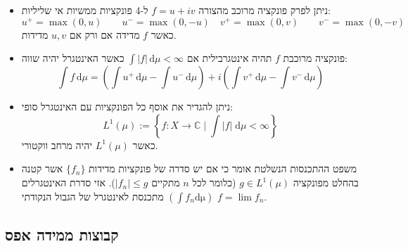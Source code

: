 \documentclass{tstextbook}
\begin{document}
\begin{summary}
  \begin{itemize}
    \item ניתן לפרק פונקציה מרוכב מהצורה \(f = u + iv\) ל-4 פונקציות ממשיות אי שליליות:
$$u^+ = \max(0, u) \qquad u^- = \max(0, -u)\quad v^+ = \max(0, v) \qquad v^- = \max(0, -v)$$
כאשר \(f\) מדידה אם ורק אם \(u, v\) מדידות.
    \item פונקציה מרוכבת \(f\) תהיה אינטגרבילית אם \(\int |f| \, \mathrm{d}\mu < \infty\) כאשר האינטגרל יהיה שווה:
$$\int f \, \mathrm{d}\mu = \left( \int u^+ \, \mathrm{d}\mu - \int u^- \, \mathrm{d}\mu \right) + i \left( \int v^+ \, \mathrm{d}\mu - \int v^- \, \mathrm{d}\mu \right)$$
    \item ניתן להגדיר את אוסף כל הפונקציות עם האינטגרל סופי:
$$L^{1}\left( \mu \right):= \left\{  f:X\to \mathbb{C} \mid \int  \lvert f \rvert  \;\mathrm{d} \mu < \infty   \right\}$$
כאשר \(L^{1}\left( \mu \right)\) יהיה מרחב ווקטורי.
    \item משפט ההתכנסות הנשלטת אומר כי אם יש סדרה של פונקציות מדידות \(\{ f_{n} \}\) אשר קטנה בהחלט מפונקציה \(g \in L^{1}\left( \mu \right)\) (כלומר לכל \(n\) מתקיים \(|f_{n}|\leq g\)). אזי סדרת האינטגרלים \(\left( \int f_{n}\mathrm{d\mu} \right)\) מתכנסת לאינטגרל של הגבול הנקודתי \(f=\lim f_{n}\).
  \end{itemize}
\end{summary}
\subsection{קבוצות ממידה אפס}
\end{document}
